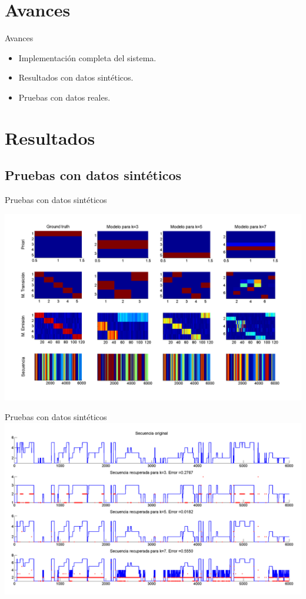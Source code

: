\documentclass[10pt]{beamer}
\begin{document}
\section{Avances}
\begin{frame}{Avances}
  \begin{itemize}
    \itemsep 3em
    \item Implementación completa del sistema.
    \item Resultados con datos sintéticos.
    \item Pruebas con datos reales.
  \end{itemize}
\end{frame}

\section{Resultados}
\subsection{Pruebas con datos sintéticos}
\begin{frame}{Pruebas con datos sintéticos}
  \begin{center}
    \includegraphics[height=0.65\textwidth]{gfx/pruebasg}
  \end{center}
\end{frame}

\begin{frame}{Pruebas con datos sintéticos}
  \includegraphics[height=0.6\textwidth]{gfx/pruebasg_}
\end{frame}
\end{document}
